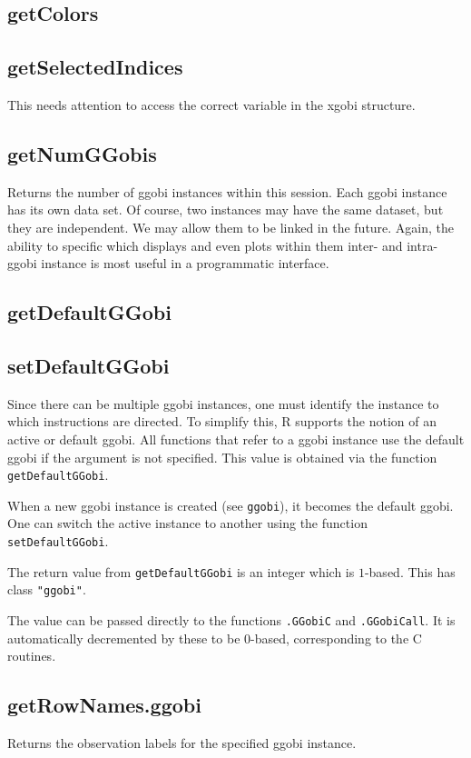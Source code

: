 \documentclass{article}
\def\SFunction#1{{\texttt{\red #1}}}
\begin{document}
\subsection{getColors}


\subsection{getSelectedIndices}
This needs attention to access the correct
variable in the xgobi structure.


\subsection{getNumGGobis}
Returns the number of ggobi instances within this session.  Each ggobi
instance has its own data set. Of course, two instances may have the
same dataset, but they are independent.  We may allow them to be
linked in the future.  Again, the ability to specific which displays
and even plots within them inter- and intra- ggobi instance is most
useful in a programmatic interface.

\subsection{getDefaultGGobi}
\subsection{setDefaultGGobi}
Since there can be multiple ggobi instances, one must identify the
instance to which instructions are directed.  To simplify this, R
supports the notion of an active or default ggobi.  All functions that
refer to a ggobi instance use the default ggobi if the 
argument is not specified.  This value is obtained via the function
\SFunction{getDefaultGGobi}.

When a new ggobi instance is created (see \SFunction{ggobi}), it
becomes the default ggobi.  One can switch the active instance to
another using the function \SFunction{setDefaultGGobi}.

The return value from \SFunction{getDefaultGGobi} is an integer which
is $1$-based.  This has class \texttt{"ggobi"}.

The value can be passed directly to the functions \SFunction{.GGobiC}
and \SFunction{.GGobiCall}.  It is automatically decremented by these
to be $0$-based, corresponding to the C routines.


\subsection{getRowNames.ggobi}
Returns the observation labels for the specified ggobi instance.
\end{document}
